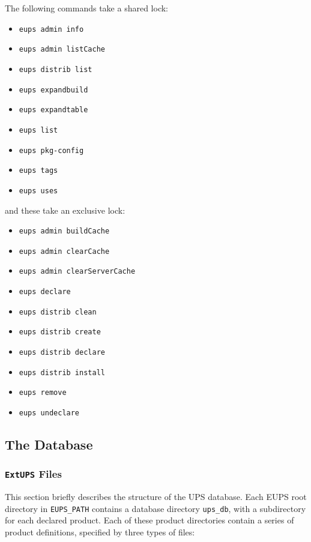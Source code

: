 \documentclass{article}
\newcommand{\code}[1]{\texttt{#1}}
\newcommand{\eups}{\code{ExtUPS}\xspace}
\begin{document}
The following commands take a shared lock:
\begin{itemize}
\item \code{eups admin info}
\item \code{eups admin listCache}
\item \code{eups distrib list}
\item \code{eups expandbuild}
\item \code{eups expandtable}
\item \code{eups list}
\item \code{eups pkg-config}
\item \code{eups tags}
\item \code{eups uses}
\end{itemize}
and these take an exclusive lock:
\begin{itemize}
\item \code{eups admin buildCache}
\item \code{eups admin clearCache}
\item \code{eups admin clearServerCache}
\item \code{eups declare}
\item \code{eups distrib clean}
\item \code{eups distrib create}
\item \code{eups distrib declare}
\item \code{eups distrib install}
\item \code{eups remove}
\item \code{eups undeclare}
\end{itemize}



\subsection{The Database}

\subsubsection{\eups Files}

This section briefly describes the structure of the UPS database. Each
EUPS root directory in \code{EUPS\_PATH} contains a database directory
\code{ups\_db}, with a subdirectory for each declared product.  Each
of these product directories contain a series of product definitions,
specified by three types of files:
\end{document}
